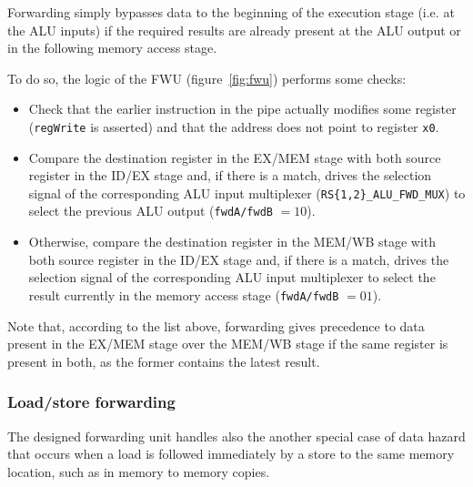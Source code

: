 \documentclass[a4paper]{article}
\begin{document}
Forwarding simply bypasses data to the beginning of the execution stage (i.e. at the ALU inputs) if the required results are already present at the ALU output or in the following memory access stage.

To do so, the logic of the FWU (figure~\ref{fig:fwu}) performs some checks:
\begin{itemize}
    \item Check that the earlier instruction in the pipe actually modifies some register (\texttt{regWrite} is asserted) and that the address does not point to register \texttt{x0}.
    \item Compare the destination register in the EX/MEM stage with both source register in the ID/EX stage and, if there is a match, drives the selection signal of the corresponding ALU input multiplexer (\texttt{RS\{1,2\}\_ALU\_FWD\_MUX}) to select the previous ALU output (\texttt{fwdA/fwdB} $= 10$).
    \item Otherwise, compare the destination register in the MEM/WB stage with both source register in the ID/EX stage and, if there is a match, drives the selection signal of the corresponding ALU input multiplexer to select the result currently in the memory access stage (\texttt{fwdA/fwdB} $= 01$).
\end{itemize}

Note that, according to the list above, forwarding gives precedence to data present in the EX/MEM stage over the MEM/WB stage if the same register is present in both, as the former contains the latest result.

\subsubsection{Load/store forwarding}
\label{sec:load_store_fwd}
The designed forwarding unit handles also the another special case of data hazard that occurs when a load is followed immediately by a store to the same memory location, such as in memory to memory copies.
\end{document}
